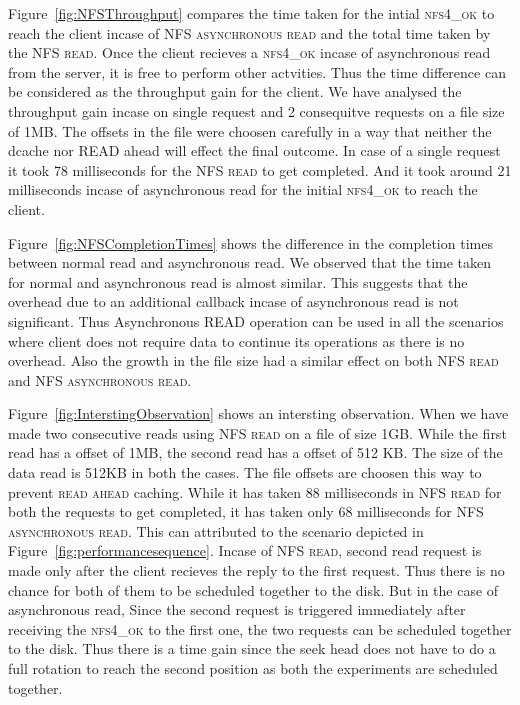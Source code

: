 Figure~\ref{fig:NFSThroughput} compares the  time taken for the intial \textsc{nfs4\_ok} to reach the client incase of \textsc{NFS asynchronous read} and the total time taken by the \textsc{NFS read}.
Once the client recieves a \textsc{nfs4\_ok}  incase of asynchronous read from the server, it is free to perform other actvities. Thus the time difference can be considered as the throughput gain for the client. We have analysed the throughput gain incase on single request and 2 consequitve requests on a file size of 1MB. The offsets in the file were choosen carefully in a way that neither the dcache nor READ ahead will effect the final outcome. In case of a single request it took 78 milliseconds for the 
\textsc{NFS read} to get completed. And it took around 21 milliseconds incase of asynchronous read for the initial \textsc{nfs4\_ok}  to reach the client. 



	Figure~\ref{fig:NFSCompletionTimes} shows the  difference in the completion times between normal read and asynchronous read. We observed that the time taken for normal and asynchronous read is almost similar. This suggests that the overhead due to an additional callback incase of asynchronous read is not significant. Thus Asynchronous READ operation can be used in all the scenarios where client does not require data to continue its operations as there is no overhead. Also the growth in the file size had a similar effect on both \textsc{NFS read} and \textsc{NFS asynchronous read}. 


 Figure~\ref{fig:InterstingObservation} shows an intersting observation. When we have made two consecutive reads  using \textsc{NFS read} on a file of size 1GB. While the first read has a offset of 1MB, the second read has a offset of 512 KB. The size of the data read is 512KB in both the cases. The file offsets are choosen this way to prevent \textsc{read ahead} caching. While it has taken 88 milliseconds  in \textsc{NFS read} for both the requests to get completed, it has taken only 68 milliseconds for \textsc{NFS asynchronous read}. This can attributed to the scenario depicted  in   Figure~\ref{fig:performancesequence}. Incase of \textsc{NFS read}, second read request is made only after the client recieves the reply to the first request. Thus there is no chance for both of them to be scheduled together to the disk. But in the case of asynchronous read, Since the second request is triggered immediately after receiving the  \textsc{nfs4\_ok}  to the first one, the two requests can be scheduled together to the disk. Thus there is a time gain since the seek head does not have to do a full rotation to reach the second position as both the experiments are scheduled together.    


